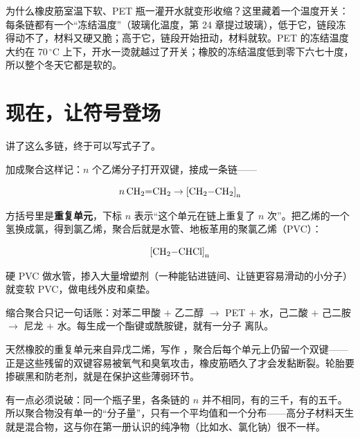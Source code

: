 为什么橡皮筋室温下软、PET 瓶一灌开水就变形收缩？这里藏着一个温度开关：每条链都有一个“冻结温度”（玻璃化温度，第 24 章提过玻璃），低于它，链段冻得动不了，材料又硬又脆；高于它，链段开始扭动，材料就软。PET 的冻结温度大约在 $70\,^{\circ}\mathrm{C}$ 上下，开水一烫就越过了开关；橡胶的冻结温度低到零下六七十度，所以整个冬天它都是软的。

\section{现在，让符号登场}

讲了这么多链，终于可以写式子了。

加成聚合这样记：$n$ 个乙烯分子打开双键，接成一条链——

\[n\,\mathrm{CH_2{=}CH_2} \rightarrow \mathrm{{[CH_2{-}CH_2]}_{n}}\]

方括号里是\textbf{重复单元}，下标 $n$ 表示“这个单元在链上重复了 $n$ 次”。把乙烯的一个氢换成氯，得到氯乙烯，聚合后就是水管、地板革用的聚氯乙烯（PVC）：

\[\mathrm{{[CH_2{-}CHCl]}_{n}}\]

硬 PVC 做水管，掺入大量增塑剂（一种能钻进链间、让链更容易滑动的小分子）就变软 PVC，做电线外皮和桌垫。

缩合聚合只记一句话账：对苯二甲酸 $+$ 乙二醇 $\rightarrow$ PET $+$ 水，己二酸 $+$ 己二胺 $\rightarrow$ 尼龙 $+$ 水。每生成一个酯键或酰胺键，就有一分子  离队。

天然橡胶的重复单元来自异戊二烯，写作 ，聚合后每个单元上仍留一个双键——正是这些残留的双键容易被氧气和臭氧攻击，橡皮筋晒久了才会发黏断裂。轮胎要掺碳黑和防老剂，就是在保护这些薄弱环节。

有一点必须说破：同一个瓶子里，各条链的 $n$ 并不相同，有的三千，有的五千。所以聚合物没有单一的“分子量”，只有一个平均值和一个分布——高分子材料天生就是混合物，这与你在第一册认识的纯净物（比如水、氯化钠）很不一样。

